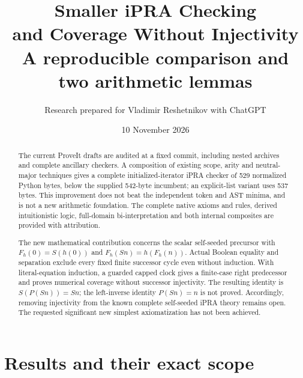 \documentclass[11pt,letterpaper]{article}
\title{\color{ink}\bfseries Smaller iPRA Checking\\and Coverage Without Injectivity\\[9pt]
\large A reproducible comparison and two arithmetic lemmas}
\author{Research prepared for Vladimir Reshetnikov with ChatGPT}
\date{10 November 2026}
\theoremstyle{definition}\newtheorem{definition}[theorem]{Definition}
\theoremstyle{remark}\newtheorem{remark}[theorem]{Remark}
\begin{document}
\maketitle
\begin{abstract}
The current ProveIt drafts are audited at a fixed commit, including nested
archives and complete ancillary checkers. A composition of existing scope,
arity and neutral-major techniques gives a complete initialized-iterator
iPRA checker of 529 normalized Python bytes, below the supplied 542-byte
incumbent; an explicit-list variant uses 537 bytes. This improvement does
not beat the independent token and AST minima, and is not a new arithmetic
foundation. The complete native axioms and rules, derived intuitionistic
logic, full-domain bi-interpretation and both internal composites are
provided with attribution.

The new mathematical contribution concerns the scalar self-seeded precursor
with $F_h(0)=S(h(0))$ and $F_h(Sn)=h(F_h(n))$. Actual Boolean equality and
separation exclude every fixed finite successor cycle even without
induction. With literal-equation induction, a guarded capped clock gives
a finite-case right predecessor and proves numerical coverage without
successor injectivity. The resulting identity is $S(P(Sn))=Sn$; the
left-inverse identity $P(Sn)=n$ is not proved. Accordingly, removing
injectivity from the known complete self-seeded iPRA theory remains open.
The requested significant new simplest axiomatization has not been achieved.
\end{abstract}
\begin{center}
\end{center}
\clearpage
\setcounter{tocdepth}{1}
\hypersetup{bookmarksdepth=2}
\begingroup\small\setlength{\parskip}{0pt}\tableofcontents\endgroup
\clearpage

\section{Results and their exact scope}
\label{sec:results}
\end{document}
